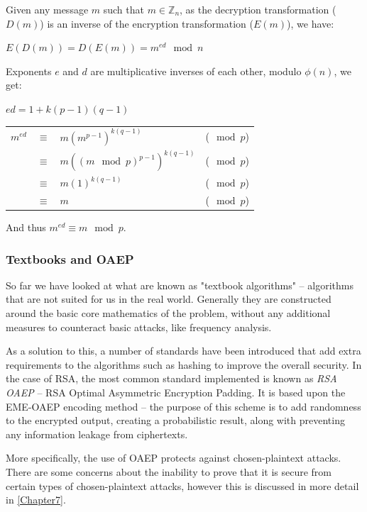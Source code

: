     Given any message $m$ such that $m \in \mathbb{Z}_n$, as the decryption transformation ($D(m)$) is an inverse of the encryption transformation ($E(m)$), we have: 
    \begin{center}
      $E(D(m)) = D(E(m)) = m^{ed} \mod n$
    \end{center}
    
    Exponents $e$ and $d$ are multiplicative inverses of each other, modulo $\phi(n)$, we get:
    \begin{center}
      $ed = 1 + k(p-1)(q-1)$
    \end{center}
    
    \begin{center}
      \begin{tabular}{ l l l l }
        $m^{ed}$ & $\equiv$ & $m(m^{p-1})^{k(q-1)}$ & ($\mod p$) \\
         & $\equiv$ & $m((m \mod p)^{p-1})^{k(q-1)}$ & ($\mod p$) \\
         & $\equiv$ & $m(1)^{k(q-1)}$ & ($\mod p$) \\
         & $\equiv$ & $m$ & ($\mod p$)
      \end{tabular}
    \end{center}
    
    And thus $m^{ed} \equiv m \mod p$.
    
    \subsubsection{Textbooks and OAEP}
    
    So far we have looked at what are known as "textbook algorithms" -- algorithms that are not suited for us in the real world. Generally they are constructed around the basic core mathematics of the problem, without any additional measures to counteract basic attacks, like frequency analysis. 
    
    As a solution to this, a number of standards have been introduced that add extra requirements to the algorithms such as hashing to improve the overall security. In the case of RSA, the most common standard implemented is known as \emph{RSA OAEP} -- RSA Optimal Asymmetric Encryption Padding\cite{Bellare:1995aa}. It is based upon the EME-OAEP encoding method -- the purpose of this scheme is to add randomness to the encrypted output, creating a probabilistic result, along with preventing any information leakage from ciphertexts.
    
    More specifically, the use of OAEP protects against chosen-plaintext attacks. There are some concerns about the inability to prove that it is secure from certain types of chosen-plaintext attacks, however this is discussed in more detail in \textsection\ref{Chapter7}.
    
